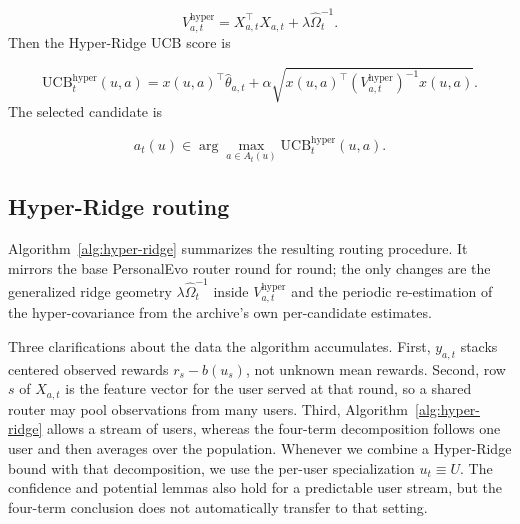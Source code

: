 \documentclass{article} %
\begin{document}
\begin{equation}
\label{eq:hyper-design}
V_{a,t}^{\mathrm{hyper}} = X_{a,t}^\top X_{a,t} + \lambda \widehat{\Omega}_t^{-1}.
\end{equation}
Then the Hyper-Ridge UCB score is

\begin{equation}
\label{eq:hyper-ucb}
\mathrm{UCB}_t^{\mathrm{hyper}}(u, a)
= x(u, a)^\top \widehat{\theta}_{a,t}
+ \alpha \sqrt{ x(u, a)^\top \left( V_{a,t}^{\mathrm{hyper}} \right)^{-1} x(u, a) }.
\end{equation}
The selected candidate is

\begin{equation}
a_t(u) \in \arg\max_{a \in A_t(u)} \mathrm{UCB}_t^{\mathrm{hyper}}(u, a).
\end{equation}
\subsection{Hyper-Ridge routing}

\label{sec:method-alg}

Algorithm~\ref{alg:hyper-ridge} summarizes the resulting routing procedure.
It mirrors the base PersonalEvo router round for round; the only changes are
the generalized ridge geometry $\lambda \widehat{\Omega}_t^{-1}$ inside
$V_{a,t}^{\mathrm{hyper}}$ and the periodic re-estimation of the
hyper-covariance from the archive's own per-candidate estimates.

Three clarifications about the data the algorithm accumulates. First, $y_{a,t}$ stacks centered observed rewards $r_s-b(u_s)$, not unknown mean rewards. Second, row $s$ of $X_{a,t}$ is the feature vector for the user served at that round, so a shared router may pool observations from many users. Third, Algorithm~\ref{alg:hyper-ridge} allows a stream of users, whereas the four-term decomposition follows one user and then averages over the population. Whenever we combine a Hyper-Ridge bound with that decomposition, we use the per-user specialization $u_t\equiv U$. The confidence and potential lemmas also hold for a predictable user stream, but the four-term conclusion does not automatically transfer to that setting.
\end{document}
